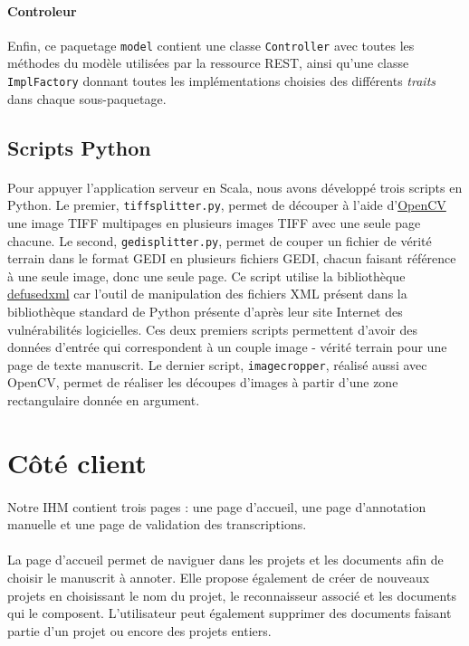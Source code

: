 \paragraph{Controleur}
Enfin, ce paquetage \texttt{model} contient une classe \texttt{Controller} avec toutes les méthodes du modèle utilisées par la ressource REST, ainsi qu'une classe \texttt{ImplFactory} donnant toutes les implémentations choisies des différents \textit{traits} dans chaque sous-paquetage.

\subsection{Scripts Python}

\paragraph{}
Pour appuyer l'application serveur en Scala, nous avons développé trois scripts en Python. Le premier, \texttt{tiffsplitter.py}, permet de découper à l'aide d'\href{https://opencv.org/}{OpenCV} une image TIFF multipages en plusieurs images TIFF avec une seule page chacune. Le second, \texttt{gedisplitter.py}, permet de couper un fichier de vérité terrain dans le format GEDI en plusieurs fichiers GEDI, chacun faisant référence à une seule image, donc une seule page. Ce script utilise la bibliothèque \href{https://pypi.org/project/defusedxml/}{defusedxml} car l'outil de manipulation des fichiers XML présent dans la bibliothèque standard de Python présente d'après leur site Internet des vulnérabilités logicielles. Ces deux premiers scripts permettent d'avoir des données d'entrée qui correspondent à un couple image - vérité terrain pour une page de texte manuscrit. Le dernier script, \texttt{imagecropper}, réalisé aussi avec OpenCV, permet de réaliser les découpes d'images à partir d'une zone rectangulaire donnée en argument.

\section{Côté client}
\paragraph{}
Notre IHM contient trois pages : une page d'accueil, une page d'annotation manuelle et une page de validation des transcriptions.
\paragraph{}
La page d'accueil permet de naviguer dans les projets et les documents afin de choisir le manuscrit à annoter. Elle propose également de créer de nouveaux projets en choisissant le nom du projet, le reconnaisseur associé et les documents qui le composent. L'utilisateur peut également supprimer des documents faisant partie d'un projet ou encore des projets entiers.
